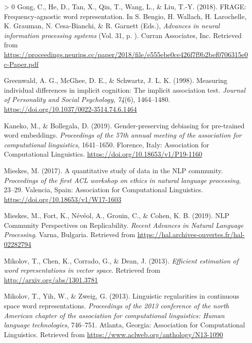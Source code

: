 \documentclass[
  english,
  man,floatsintext]{apa6}
\newlength{\cslhangindent}
\newenvironment{CSLReferences}[3] %
 {%
  \setlength{\parindent}{0pt}
  \ifodd #1 \everypar{\setlength{\hangindent}{\cslhangindent}}\ignorespaces\fi
  \ifnum #2 > 0
  \setlength{\parskip}{#3\baselineskip}
  \fi
 }%
 {}
\begin{document}
\begin{CSLReferences}{1}{0}
\leavevmode\hypertarget{ref-gong_2018}{}%
Gong, C., He, D., Tan, X., Qin, T., Wang, L., \& Liu, T.-Y. (2018). FRAGE: Frequency-agnostic word representation. In S. Bengio, H. Wallach, H. Larochelle, K. Grauman, N. Cesa-Bianchi, \& R. Garnett (Eds.), \emph{Advances in neural information processing systems} (Vol. 31, p. ). Curran Associates, Inc. Retrieved from \url{https://proceedings.neurips.cc/paper/2018/file/e555ebe0ce426f7f9b2bef0706315e0c-Paper.pdf}

\leavevmode\hypertarget{ref-greenwald_1998}{}%
Greenwald, A. G., McGhee, D. E., \& Schwartz, J. L. K. (1998). Measuring individual differences in implicit cognition: The implicit association test. \emph{Journal of Personality and Social Psychology}, \emph{74}(6), 1464--1480. \url{https://doi.org/10.1037/0022-3514.74.6.1464}

\leavevmode\hypertarget{ref-kaneko_2019}{}%
Kaneko, M., \& Bollegala, D. (2019). Gender-preserving debiasing for pre-trained word embeddings. \emph{Proceedings of the 57th annual meeting of the association for computational linguistics}, 1641--1650. Florence, Italy: Association for Computational Linguistics. \url{https://doi.org/10.18653/v1/P19-1160}

\leavevmode\hypertarget{ref-mieskes_2017}{}%
Mieskes, M. (2017). A quantitative study of data in the {NLP} community. \emph{Proceedings of the first {ACL} workshop on ethics in natural language processing}, 23--29. Valencia, Spain: Association for Computational Linguistics. \url{https://doi.org/10.18653/v1/W17-1603}

\leavevmode\hypertarget{ref-mieskes_2019}{}%
Mieskes, M., Fort, K., Névéol, A., Grouin, C., \& Cohen, K. B. (2019). {NLP Community Perspectives on Replicability.} \emph{{Recent Advances in Natural Language Processing}}. Varna, Bulgaria. Retrieved from \url{https://hal.archives-ouvertes.fr/hal-02282794}

\leavevmode\hypertarget{ref-mikolov2013Google}{}%
Mikolov, T., Chen, K., Corrado, G., \& Dean, J. (2013). \emph{Efficient estimation of word representations in vector space}. Retrieved from \url{http://arxiv.org/abs/1301.3781}

\leavevmode\hypertarget{ref-mikolov2013MSR}{}%
Mikolov, T., Yih, W., \& Zweig, G. (2013). Linguistic regularities in continuous space word representations. \emph{Proceedings of the 2013 conference of the north {A}merican chapter of the association for computational linguistics: Human language technologies}, 746--751. Atlanta, Georgia: Association for Computational Linguistics. Retrieved from \url{https://www.aclweb.org/anthology/N13-1090}


\end{CSLReferences}
\end{document}
